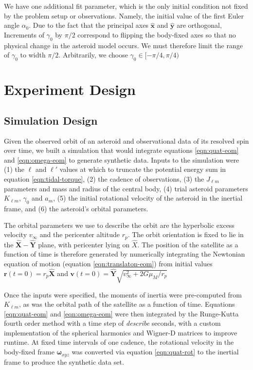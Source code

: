 \documentclass{aastex631}
\newcommand{\unit}[1]{\hat{\bm{#1}}}
\newcommand{\jtd}[1]{{\color{red}\textit{#1}}}
\begin{document}
We have one additional fit parameter, which is the only initial condition not fixed by the problem setup or observations. Namely, the initial value of the first Euler angle $\alpha_0$. Due to the fact that the principal axes $\unit x$ and $\unit y$ are orthogonal, Increments of $\gamma_0$ by $\pi/2$ correspond to flipping the body-fixed axes so that no physical change in the asteroid model occurs. We must therefore limit the range of $\gamma_0$ to width $\pi/2$. Arbitrarily, we choose $\gamma_0 \in [-\pi/4, \pi/4)$

\section{Experiment Design}
\subsection{Simulation Design}
\label{sec:simulation}
Given the observed orbit of an asteroid and observational data of its resolved spin over time, we built a simulation that would integrate equations \ref{eqn:quat-eom} and \ref{eqn:omega-eom} to generate synthetic data. Inputs to the simulation were (1) the $\ell$ and $\ell'$ values at which to truncate the potential energy sum in equation \ref{eqn:tidal-torque}, (2) the cadence of observations, (3) the $J_{\ell m}$ parameters and mass and radius of the central body, (4) trial asteroid parameters $K_{\ell m}$, $\gamma_0$ and $a_m$, (5) the initial rotational velocity of the asteroid in the inertial frame, and (6) the asteroid's orbital parameters.

The orbital parameters we use to describe the orbit are the hyperbolic excess velocity $v_\infty$ and the pericenter altitude $r_p$. The orbit orientation is fixed to lie in the $\unit X-\unit Y$ plane, with pericenter lying on $\hat X$. The position of the satellite as a function of time is therefore generated by numerically integrating the Newtonian equation of motion (equation \ref{eqn:translaton-eom}) from initial values $\bm r(t=0) = r_p \unit X$ and $\bm v(t=0)=\unit Y \sqrt{v_\infty^2 + 2G\mu_M / r_p}$

Once the inputs were specified, the moments of inertia were pre-computed from $K_{\ell m}$, as was the orbital path of the satellite as a function of time. Equations \ref{eqn:quat-eom} and \ref{eqn:omega-eom} were then integrated by the Runge-Kutta fourth order method with a time step of \jtd{describe} seconds, with a custom implementation of the spherical harmonics and Wigner-D matrices to improve runtime. At fixed time intervals of one cadence, the rotational velocity in the body-fixed frame $\bm\omega_{xyz}$ was converted via equation \ref{eqn:quat-rot} to the inertial frame to produce the synthetic data set.
\end{document}
